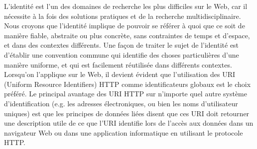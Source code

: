 \documentclass[a4paper]{article}
\begin{document}
L'identité est l'un des domaines de recherche les plus difficiles sur le Web, car il nécessite à la fois des solutions pratiques et de la recherche multidisciplinaire. Nous croyons que l'identité implique de pouvoir se référer à quoi que ce soit de manière fiable, abstraite ou plus concrète, sans contraintes de temps et d'espace, et dans des contextes différents. Une façon de traiter le sujet de l'identité est d'établir une convention commune qui identifie des choses particulières d'une manière uniforme, et qui est facilement réutilisée dans différents contextes. Lorsqu'on l'applique sur le Web, il devient évident que l'utilisation des URI (Uniform Resource Identifiers) HTTP comme identificateurs globaux est le choix préféré. Le principal avantage des URI HTTP sur n'importe quel autre système d'identification (e.g. les adresses électroniques, ou bien les noms d'utilisateur uniques) est que les principes de données liées disent que ces URI doit retourner une description utile de ce que l'URI identifie lors de l'accès aux données dans un navigateur Web ou dans une application informatique en utilisant le protocole HTTP.\\
\end{document}
